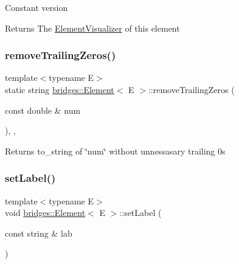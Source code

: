 Constant version

\begin{DoxyReturn}{Returns}
The \hyperlink{classbridges_1_1_element_visualizer}{Element\+Visualizer} of this element 
\end{DoxyReturn}
\hypertarget{classbridges_1_1_element_a0b905a076a71771a20ee4fb0ec858cfa}{}\label{classbridges_1_1_element_a0b905a076a71771a20ee4fb0ec858cfa} 
\subsubsection{\texorpdfstring{remove\+Trailing\+Zeros()}{removeTrailingZeros()}}
{\footnotesize\ttfamily template$<$typename E$>$ \\
static string \hyperlink{classbridges_1_1_element}{bridges\+::\+Element}$<$ E $>$\+::remove\+Trailing\+Zeros (\begin{DoxyParamCaption}\item[{const double \&}]{num }\end{DoxyParamCaption})\hspace{0.3cm}{\ttfamily [inline]}, {\ttfamily [static]}, {\ttfamily [protected]}}

\begin{DoxyReturn}{Returns}
to\+\_\+string of \char`\"{}num\char`\"{} without unnessasary trailing 0s 
\end{DoxyReturn}
\hypertarget{classbridges_1_1_element_a22313b74452175d07650168a701daa99}{}\label{classbridges_1_1_element_a22313b74452175d07650168a701daa99} 
\subsubsection{\texorpdfstring{set\+Label()}{setLabel()}}
{\footnotesize\ttfamily template$<$typename E$>$ \\
void \hyperlink{classbridges_1_1_element}{bridges\+::\+Element}$<$ E $>$\+::set\+Label (\begin{DoxyParamCaption}\item[{const string \&}]{lab }\end{DoxyParamCaption})\hspace{0.3cm}{\ttfamily [inline]}}

